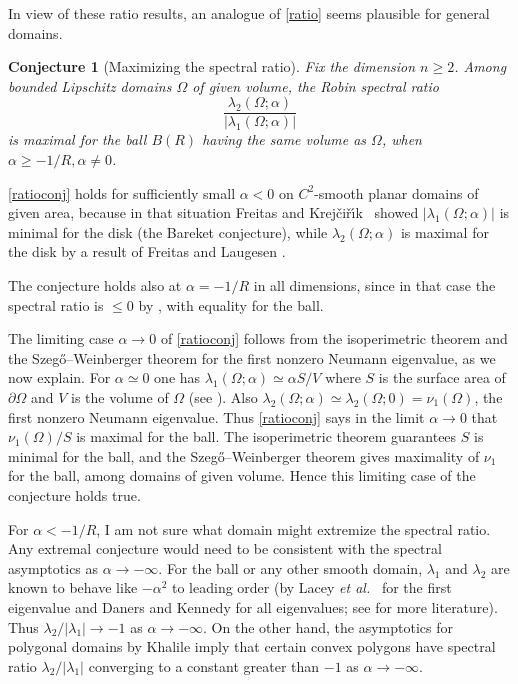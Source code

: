 \documentclass[12pt,reqno]{amsart}
\newtheorem{conjx}{Conjecture}
\theoremstyle{definition}
\newcommand{\Krejcirik}{{Krej\v{c}i\v{r}\'{\i}k}}
\begin{document}
In view of these ratio results, an analogue of \autoref{ratio} seems plausible for general domains. 
%
\begin{conjx}[Maximizing the spectral ratio]\label{ratioconj} Fix the dimension $n \geq 2$. Among bounded Lipschitz domains $\Omega$ of given volume, the Robin spectral ratio 
\[
\frac{\lambda_2(\Omega;\alpha)}{|\lambda_1(\Omega;\alpha)|}
\]
is maximal for the ball $B(R)$ having the same volume as $\Omega$, when $\alpha \geq -1/R, \alpha \neq 0$.
\end{conjx}
%
\autoref{ratioconj} holds for sufficiently small $\alpha<0$ on $C^2$-smooth planar domains of given area, because in that situation Freitas and \Krejcirik\ \cite[Theorem 2]{FK15} showed $|\lambda_1(\Omega;\alpha)|$ is minimal for the disk (the Bareket conjecture), while $\lambda_2(\Omega;\alpha)$ is maximal for the disk by a result of Freitas and Laugesen \cite[Theorem A]{FL18a}. 

The conjecture holds also at $\alpha=-1/R$ in all dimensions, since in that case the spectral ratio is $\leq 0$ by \cite[Theorem A]{FL18a}, with equality for the ball. 

The limiting case $\alpha \to 0$ of \autoref{ratioconj} follows from the isoperimetric theorem and the Szeg\H{o}--Weinberger theorem \cite{W56} for the first nonzero Neumann eigenvalue, as we now explain. For $\alpha \simeq 0$ one has $\lambda_1(\Omega;\alpha) \simeq \alpha S/V$ where $S$ is the surface area of $\partial \Omega$ and $V$ is the volume of $\Omega$ (see \cite[p.\,89]{H17}). Also $\lambda_2(\Omega;\alpha) \simeq \lambda_2(\Omega;0)=\nu_1(\Omega)$, the first nonzero Neumann eigenvalue. Thus \autoref{ratioconj} says in the limit $\alpha \to 0$ that $\nu_1(\Omega)/S$ is maximal for the ball. The isoperimetric theorem guarantees $S$ is minimal for the ball, and the Szeg\H{o}--Weinberger theorem gives maximality of $\nu_1$ for the ball, among domains of given volume. Hence this limiting case of the conjecture holds true. 

For $\alpha < -1/R$, I am not sure what domain might extremize the spectral ratio. Any extremal conjecture would need to be consistent with the spectral asymptotics as $\alpha \to -\infty$. For the ball or any other smooth domain, $\lambda_1$ and $\lambda_2$ are known to behave like $-\alpha^2$ to leading order (by Lacey \emph{et al.}\ \cite{LOS98} for the first eigenvalue and Daners and Kennedy \cite{DK10} for all eigenvalues; see \cite[{\S}4]{H17} for more literature). Thus $\lambda_2/|\lambda_1| \to -1$ as $\alpha \to -\infty$. On the other hand, the asymptotics for polygonal domains by Khalile \cite[Corollary 1.3, Theorem 3.6]{Kh18} imply that certain convex polygons have spectral ratio $\lambda_2/|\lambda_1|$ converging to a constant greater than $-1$ as $\alpha \to -\infty$. 
\end{document}
